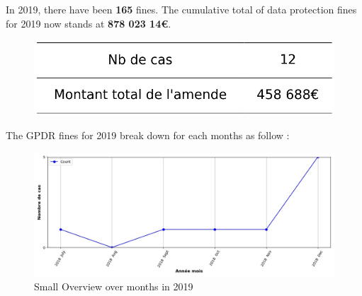 \documentclass[12pt]{article}
\begin{document}
	\begin{multicols}{2}
	
	In 2019, there have been \textbf{165} fines.
	The cumulative total of data protection fines for 2019 now stands at \textbf{878 023 14€}.
	
	\begin{figure}[H]
	\centering\includegraphics[width=1\linewidth]{graphs/counter_year}
	\end{figure}


	The GPDR fines for 2019 break down for each months as follow :

	\begin{figure}
	[H]\centering\includegraphics[width = 1.2\linewidth]{graphs/NbFinesPerMonth_year_graph}
	\caption{Small Overview over months in 2019}
	\end{figure}

	\end{multicols}
\end{document}
